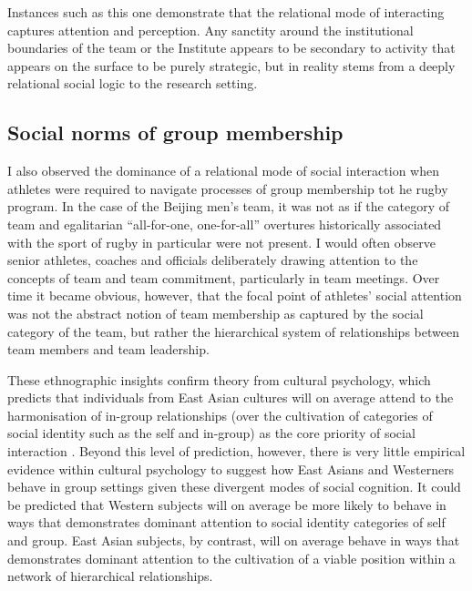 \begin{CJK}{UTF8}{gbsn}
Instances such as this one demonstrate that the relational mode of interacting captures attention and perception. Any sanctity around the institutional boundaries of the team or the Institute appears to be secondary to activity that appears on the surface to be purely strategic, but in reality stems from a deeply relational social logic to the research setting.



\subsection{Social norms of group membership}

I also observed the dominance of a relational mode of social interaction when athletes were required to navigate processes of group membership tot he rugby program.  In the case of the Beijing men's team, it was not as if the category of team and egalitarian ``all-for-one, one-for-all'' overtures historically associated with the sport of rugby in particular were not present.  I would often observe senior athletes, coaches and officials deliberately drawing attention to the concepts of team and team commitment, particularly in team meetings.  Over time it became obvious, however, that the focal point of athletes' social attention was not the abstract notion of team membership as captured by the social category of the team, but rather the hierarchical system of relationships between team members and team leadership.

These ethnographic insights confirm theory from cultural psychology, which predicts that individuals from East Asian cultures will on average attend to the harmonisation of in-group relationships (over the cultivation of categories of social identity such as the self and in-group) as the core priority of social interaction \citep{Yuki2003,Nisbett2003}.  Beyond this level of prediction, however, there is very little empirical evidence within cultural psychology to suggest how East Asians and Westerners behave in group settings given these divergent modes of social cognition.  It could be predicted that Western subjects will on average be more likely to behave in ways that demonstrates dominant attention to social identity categories of self and group.  East Asian subjects, by contrast, will on average behave in ways that demonstrates dominant attention to the cultivation of a viable position within a network of hierarchical relationships.


\end{CJK}

